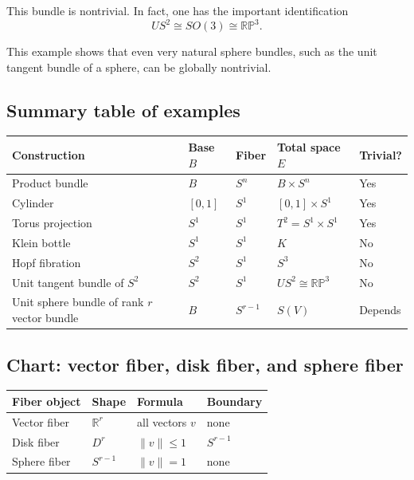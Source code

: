 \documentclass[12pt,a4paper]{article}
\theoremstyle{notespace}
\begin{document}
This bundle is nontrivial. In fact, one has the important identification
\[
US^2\cong SO(3)\cong \mathbb{RP}^3.
\]

This example shows that even very natural sphere bundles, such as the unit tangent bundle of a sphere, can be globally nontrivial.

\subsection{Summary table of examples}

\begin{center}
	\renewcommand{\arraystretch}{1.25}
	\begin{tabular}{>{\raggedright\arraybackslash}p{4cm}
			>{\centering\arraybackslash}p{2.4cm}
			>{\centering\arraybackslash}p{2.2cm}
			>{\centering\arraybackslash}p{3cm}
			>{\centering\arraybackslash}p{2cm}}
		\toprule
		\textbf{Construction} & \textbf{Base \(B\)} & \textbf{Fiber} & \textbf{Total space \(E\)} & \textbf{Trivial?} \\
		\midrule
		Product bundle & \(B\) & \(S^n\) & \(B\times S^n\) & Yes \\
		Cylinder & \([0,1]\) & \(S^1\) & \([0,1]\times S^1\) & Yes \\
		Torus projection & \(S^1\) & \(S^1\) & \(T^2=S^1\times S^1\) & Yes \\
		Klein bottle & \(S^1\) & \(S^1\) & \(K\) & No \\
		Hopf fibration & \(S^2\) & \(S^1\) & \(S^3\) & No \\
		Unit tangent bundle of \(S^2\) & \(S^2\) & \(S^1\) & \(US^2\cong \mathbb{RP}^3\) & No \\
		Unit sphere bundle of rank \(r\) vector bundle & \(B\) & \(S^{r-1}\) & \(S(V)\) & Depends \\
		\bottomrule
	\end{tabular}
\end{center}

\subsection{Chart: vector fiber, disk fiber, and sphere fiber}

\begin{center}
	\renewcommand{\arraystretch}{1.25}
	\begin{tabular}{>{\raggedright\arraybackslash}p{3.5cm}
			>{\centering\arraybackslash}p{3cm}
			>{\centering\arraybackslash}p{4cm}
			>{\centering\arraybackslash}p{3cm}}
		\toprule
		\textbf{Fiber object} & \textbf{Shape} & \textbf{Formula} & \textbf{Boundary} \\
		\midrule
		Vector fiber & \(\mathbb{R}^r\) & all vectors \(v\) & none \\
		Disk fiber & \(D^r\) & \(\|v\|\leq 1\) & \(S^{r-1}\) \\
		Sphere fiber & \(S^{r-1}\) & \(\|v\|=1\) & none \\
		\bottomrule
	\end{tabular}
\end{center}
\end{document}
